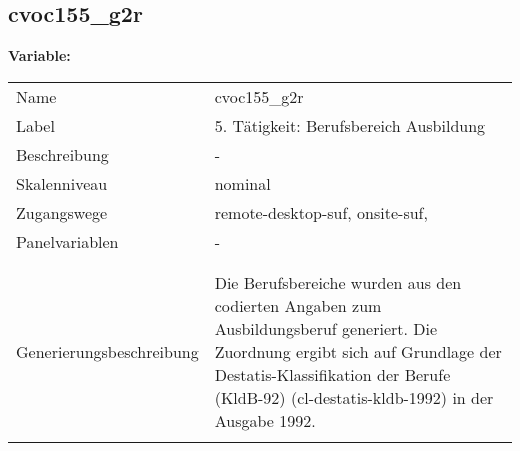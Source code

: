 	
	
	\subsection{cvoc155\_g2r}
	\label{subSection:cvoc155_g2r}

	\noindent\textbf{Variable:}\\
		\begin{tabular}{lL{11.3cm}}
			\label{tableVariable:cvoc155_g2r}
			Name & cvoc155\_g2r \\
			Label & 5. Tätigkeit: Berufsbereich Ausbildung \\
			Beschreibung & - \\
			Skalenniveau & nominal \\
			Zugangswege &
				remote-desktop-suf,
				onsite-suf,
 \\
			Panelvariablen & -
			 \\
			 \\
 \\
					Generierungsbeschreibung & Die Berufsbereiche wurden aus den codierten Angaben zum Ausbildungsberuf generiert. Die Zuordnung ergibt sich auf Grundlage der Destatis-Klassifikation der Berufe (KldB-92) (cl-destatis-kldb-1992) in der Ausgabe 1992. 
				 \\	
			 \\
		\end{tabular}






